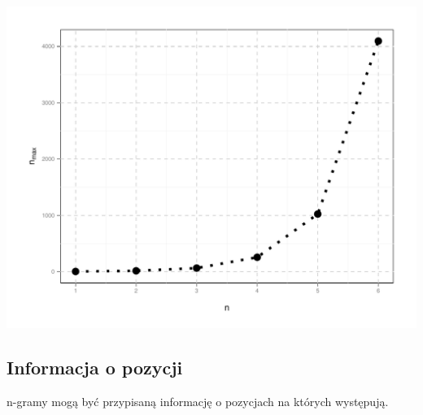 \documentclass[10pt]{beamer}\usepackage[]{graphicx}\usepackage[]{color}
\makeatletter
\def\maxwidth{ %
  \ifdim\Gin@nat@width>\linewidth
    \linewidth
  \else
    \Gin@nat@width
  \fi
}
\makeatother
\begin{document}
\begin{frame}


\includegraphics[width=\maxwidth]{figure/unnamed-chunk-5-1} 


\end{frame}

\subsection{Informacja o pozycji}

\begin{frame}

n-gramy mogą być przypisaną informację o pozycjach na których występują.

\end{frame}
\end{document}
